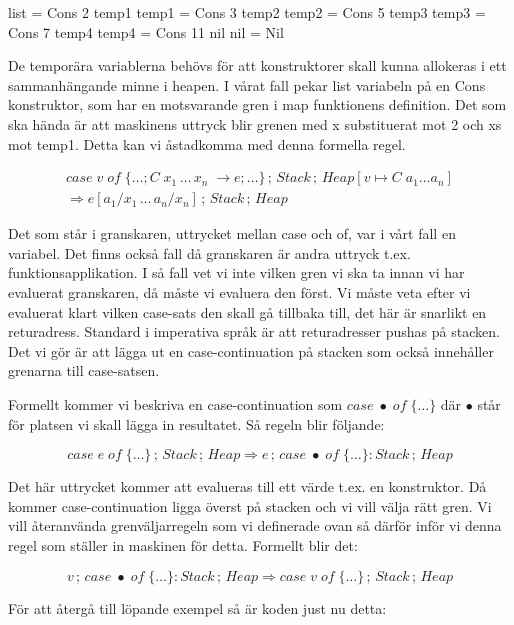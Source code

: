 \documentclass[../Core]{subfiles}
\begin{document}
\begin{codeEx}
list = Cons 2 temp1
temp1 = Cons 3 temp2
temp2 = Cons 5 temp3
temp3 = Cons 7 temp4
temp4 = Cons 11 nil
nil = Nil
\end{codeEx}

De temporära variablerna behövs för att konstruktorer skall kunna
allokeras i ett sammanhängande minne i heapen. I vårat fall pekar
list variabeln på en Cons konstruktor, som har en motsvarande gren
i map funktionens definition. Det som ska hända är att maskinens uttryck
blir grenen med x substituerat mot 2 och xs mot temp1. Detta kan vi
åstadkomma med denna formella regel.

\begin{multline*}
case\; v\; of\;\{\ldots;C\; x_{1}\,\ldots\, x_{n}\;\rightarrow e;\ldots\}\,;\, Stack\,;\, Heap[v\mapsto C\; a_{1}\ldots a_{n}]\\
\Rightarrow e[a_{1}/x_{1}\,\ldots\, a_{n}/x_{n}]\,;\, Stack\,;\, Heap\end{multline*}


Det som står i granskaren, uttrycket mellan case och of, var i vårt
fall en variabel. Det finns också fall då granskaren är andra uttryck
t.ex. funktionsapplikation. I så fall vet vi inte vilken gren vi ska
ta innan vi har evaluerat granskaren, då måste vi evaluera den först.
Vi måste veta efter vi evaluerat klart vilken case-sats den skall
gå tillbaka till, det här är snarlikt en returadress. Standard i imperativa
språk är att returadresser pushas på stacken. Det vi gör är att lägga
ut en case-continuation på stacken som också innehåller grenarna till
case-satsen. 

Formellt kommer vi beskriva en case-continuation som $case\;\bullet\; of\;\{\ldots\}$
där $\bullet$ står för platsen vi skall lägga in resultatet. Så regeln
blir följande:

\[
case\; e\; of\;\{\ldots\}\,;\, Stack\,;\, Heap\Rightarrow e\,;\, case\;\bullet\; of\;\{\ldots\}:Stack\,;\, Heap\]


Det här uttrycket kommer att evalueras till ett värde t.ex. en konstruktor.
Då kommer case-continuation ligga överst på stacken och vi vill välja
rätt gren. Vi vill återanvända grenväljarregeln som vi definerade
ovan så därför inför vi denna regel som ställer in maskinen för detta.
Formellt blir det:

\[
v\,;\, case\;\bullet\; of\;\{\ldots\}:Stack\,;\, Heap\Rightarrow case\; v\; of\;\{\ldots\}\,;\, Stack\,;\, Heap\]


För att återgå till löpande exempel så är koden just nu detta:
\end{document}

